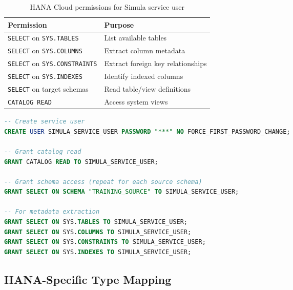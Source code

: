 \begin{table}[H]
\centering
\caption{HANA Cloud permissions for Simula service user}
\label{tab:hana-permissions}
\begin{tabularx}{\textwidth}{@{}l X@{}}
\toprule
\textbf{Permission} & \textbf{Purpose} \\
\midrule
\texttt{SELECT} on \texttt{SYS.TABLES} & List available tables \\
\texttt{SELECT} on \texttt{SYS.COLUMNS} & Extract column metadata \\
\texttt{SELECT} on \texttt{SYS.CONSTRAINTS} & Extract foreign key relationships \\
\texttt{SELECT} on \texttt{SYS.INDEXES} & Identify indexed columns \\
\texttt{SELECT} on target schemas & Read table/view definitions \\
\texttt{CATALOG READ} & Access system views \\
\bottomrule
\end{tabularx}
\end{table}

\begin{lstlisting}[language=SQL,caption={Granting minimum permissions}]
-- Create service user
CREATE USER SIMULA_SERVICE_USER PASSWORD "***" NO FORCE_FIRST_PASSWORD_CHANGE;

-- Grant catalog read
GRANT CATALOG READ TO SIMULA_SERVICE_USER;

-- Grant schema access (repeat for each source schema)
GRANT SELECT ON SCHEMA "TRAINING_SOURCE" TO SIMULA_SERVICE_USER;

-- For metadata extraction
GRANT SELECT ON SYS.TABLES TO SIMULA_SERVICE_USER;
GRANT SELECT ON SYS.COLUMNS TO SIMULA_SERVICE_USER;
GRANT SELECT ON SYS.CONSTRAINTS TO SIMULA_SERVICE_USER;
GRANT SELECT ON SYS.INDEXES TO SIMULA_SERVICE_USER;
\end{lstlisting}

\subsection{HANA-Specific Type Mapping}

